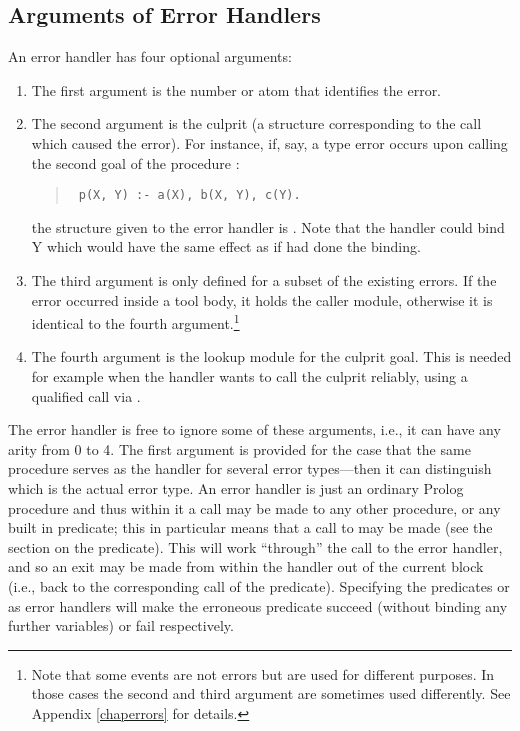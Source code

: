\subsection{Arguments of Error Handlers}
An error handler has four optional arguments:
\begin{enumerate}
\item The first argument is the number or atom that identifies the error.
\item The second argument is
the culprit (a structure corresponding to the call which caused the
error).
For instance, if,
say, a type error occurs upon calling the second goal of the procedure
:
\begin{quote}
\begin{verbatim}
 p(X, Y) :- a(X), b(X, Y), c(Y).
\end{verbatim}
\end{quote}
the structure given to the error handler is .
Note that the handler could bind Y which would have the same effect
as if  had done the binding.

\item The third argument is only defined for a subset of the existing errors.
If the error occurred inside a tool body, it holds the caller module,
otherwise it is identical to the fourth argument.\footnote{%
  Note that some events are not errors but are used for different purposes.
  In those cases the second and third argument are sometimes used
  differently. See Appendix \ref{chaperrors} for details.}

\item The fourth argument is the lookup module for the culprit goal.  This
is needed for example when the handler wants to call the culprit reliably,
using a qualified call via .
\end{enumerate}

The error handler is free to ignore some of these arguments,
i.e., it can have any arity from 0 to 4.
The first argument is provided for the case that the same procedure serves
as the handler for several error types---then it can distinguish
which is the actual error type.
An error handler is just an ordinary Prolog procedure and thus within
it a call may be made to any other procedure, or any built in predicate;
this in particular means that a call to
 may be
made (see the section on the
predicate). This will work
``through'' the call to the error handler, and so an exit may be made from
within the handler out of the current block (i.e., back to the corresponding
call of the  predicate).
Specifying the predicates  or
 as error handlers
will make the erroneous predicate succeed (without binding
any further variables) or fail respectively.

